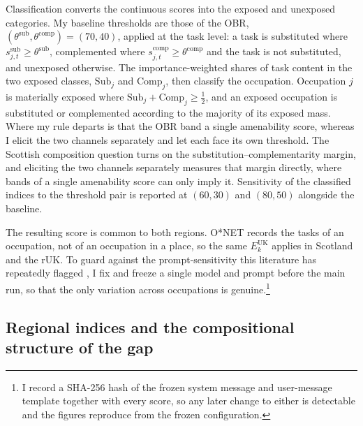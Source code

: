 Classification converts the continuous scores into the exposed and unexposed categories. My baseline thresholds are those of the OBR, $(\theta^{\mathrm{sub}}, \theta^{\mathrm{comp}}) = (70, 40)$, applied at the task level: a task is substituted where $s^{\mathrm{sub}}_{j,t} \ge \theta^{\mathrm{sub}}$, complemented where $s^{\mathrm{comp}}_{j,t} \ge \theta^{\mathrm{comp}}$ and the task is not substituted, and unexposed otherwise. The importance-weighted shares of task content in the two exposed classes, $\mathrm{Sub}_j$ and $\mathrm{Comp}_j$, then classify the occupation. Occupation $j$ is materially exposed where $\mathrm{Sub}_j + \mathrm{Comp}_j \ge \tfrac{1}{2}$, and an exposed occupation is substituted or complemented according to the majority of its exposed mass. Where my rule departs is that the OBR band a single amenability score, whereas I elicit the two channels separately and let each face its own threshold. The Scottish composition question turns on the substitution--complementarity margin, and eliciting the two channels separately measures that margin directly, where bands of a single amenability score can only imply it. Sensitivity of the classified indices to the threshold pair is reported at $(60,30)$ and $(80,50)$ alongside the baseline.

The resulting score is common to both regions. O*NET records the tasks of an occupation, not of an occupation in a place, so the same $E^{\mathrm{UK}}_k$ applies in Scotland and the rUK. To guard against the prompt-sensitivity this literature has repeatedly flagged \citep{eloundou2024, yin2026}, I fix and freeze a single model and prompt before the main run, so that the only variation across occupations is genuine.\footnote{I record a SHA-256 hash of the frozen system message and user-message template together with every score, so any later change to either is detectable and the figures reproduce from the frozen configuration.}

\subsection{Regional indices and the compositional structure of the gap}\label{sec:indices}

